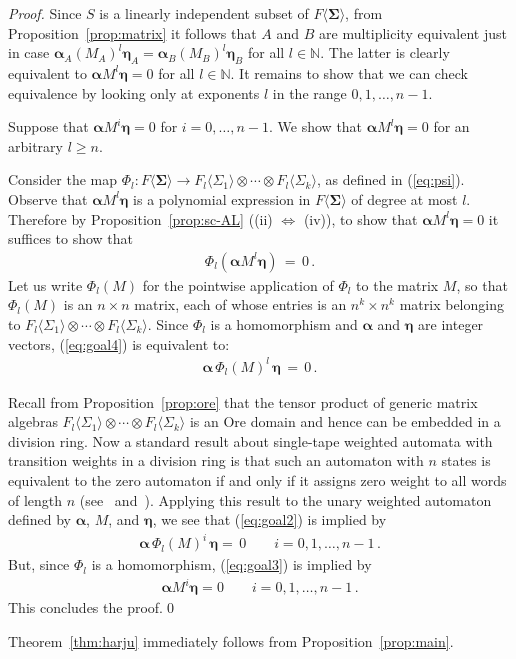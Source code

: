 \documentclass[runningheads]{llncs}
\newcommand{\valpha}{\boldsymbol{\alpha}}
\newcommand{\veta}{\boldsymbol{\eta}}
\begin{document}
\begin{proof}
Since $S$ is a linearly independent subset of $F \langle
\boldsymbol{\Sigma} \rangle$, from Proposition~\ref{prop:matrix} it
follows that $A$ and $B$ are multiplicity equivalent just in case
$\valpha_A (M_A)^l \veta_A = \valpha_B (M_B)^l \veta_B$ for all $l \in
\mathbb{N}$.  The latter is clearly equivalent to $\valpha M^l \veta =
0$ for all $l \in \mathbb{N}$.  It remains to show that we can check
equivalence by looking only at exponents $l$ in the range
$0,1,\ldots,n-1$.

Suppose that $\valpha M^i \veta = 0$ for $i=0,\ldots,n-1$.  We show
that $\valpha M^l \veta = 0$ for an arbitrary $l \geq n$.

Consider the map $\Phi_l :F \langle
\boldsymbol{\Sigma} \rangle\rightarrow F_l\langle
\Sigma_1\rangle\otimes\cdots \otimes F_l\langle \Sigma_k\rangle$, as
defined in (\ref{eq:psi}).  Observe that $\valpha M^l \veta$ is a
polynomial expression in $F \langle \boldsymbol{\Sigma} \rangle$ of degree at
most $l$.  Therefore by Proposition~\ref{prop:sc-AL} ((ii)
$\Leftrightarrow$ (iv)), to show that $\valpha M^l \veta = 0$ it
suffices to show that
\begin{gather}
\Phi_l (\valpha M^l \veta ) \, = \, 0 \, .
\label{eq:goal4}
\end{gather}
Let us write $\Phi_l(M)$ for the pointwise application of $\Phi_l$
to the matrix $M$, so that $\Phi_l(M)$
is an $n\times n$ matrix, each of whose entries is an $n^k\times n^k$
matrix belonging to
$F_l\langle \Sigma_1\rangle\otimes\cdots
\otimes F_l\langle \Sigma_k\rangle$.  Since $\Phi_l$ is a homomorphism
and $\valpha$ and $\veta$ are integer vectors,
(\ref{eq:goal4}) is equivalent to:
\begin{gather}
\valpha \, \Phi_l(M)^l \,\veta \, = \, 0 \, .
\label{eq:goal2}
\end{gather}

Recall from Proposition~\ref{prop:ore} that the tensor product of
generic matrix algebras $F_l\langle \Sigma_1\rangle\otimes\cdots
\otimes F_l\langle \Sigma_k\rangle$ is an Ore domain and hence can be
embedded in a division ring.  Now a standard result about single-tape
weighted automata with transition weights in a division ring is that
such an automaton with $n$ states is equivalent to the zero automaton
if and only if it assigns zero weight to all words of length $n$
(see~\cite[pp143--145]{Eilenberg74} and~\cite{Schutzenberger61}).
Applying this result to the unary weighted automaton defined by
$\valpha$, $M$, and $\veta$, we see that (\ref{eq:goal2}) is implied
by
\begin{gather}
\valpha \,\Phi_l(M)^i\, \veta = \, 0
\qquad i=0,1,\ldots,n-1 \, .
\label{eq:goal3}
\end{gather}
But, since $\Phi_l$ is a homomorphism, (\ref{eq:goal3}) is implied by 
\begin{gather}
\valpha M^i \veta = 0 \qquad i=0,1,\ldots,n-1 \, .
\end{gather}
This concludes the proof.\qed
\end{proof}
Theorem~\ref{thm:harju} immediately follows from
Proposition~\ref{prop:main}.  
\end{document}
